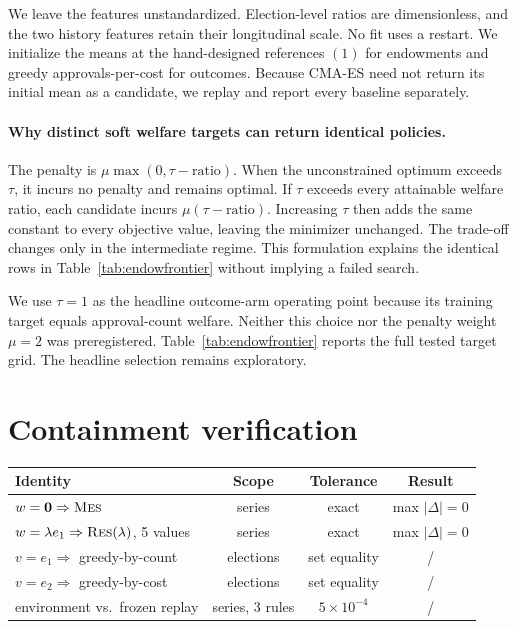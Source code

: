 We leave the features unstandardized. Election-level ratios are dimensionless,
and the two history features retain their longitudinal scale. No fit uses a
restart. We initialize the means at the hand-designed references \RES$(1)$
for endowments and greedy approvals-per-cost for outcomes. Because CMA-ES need
not return its initial mean as a candidate, we replay and report every
baseline separately.

\paragraph{Why distinct soft welfare targets can return identical policies.}
The penalty is $\mu \max(0, \tau - \text{ratio})$. When the unconstrained
optimum exceeds $\tau$, it incurs no penalty and remains optimal. If $\tau$
exceeds every attainable welfare ratio, each candidate incurs
$\mu(\tau - \text{ratio})$. Increasing $\tau$ then adds the same constant to
every objective value, leaving the minimizer unchanged. The trade-off changes
only in the intermediate regime. This formulation explains the identical rows
in Table~\ref{tab:endowfrontier} without implying a failed search.

We use $\tau=1$ as the headline outcome-arm operating point because its
training target equals \MES{} approval-count welfare. Neither this choice nor
the penalty weight $\mu=2$ was preregistered. Table~\ref{tab:endowfrontier}
reports the full tested target grid. The headline selection remains
exploratory.

\section{Containment verification}
\label{app:containment}

\begin{table}[ht]
\centering\small
\begin{tabular}{lccc}
\toprule
Identity & Scope & Tolerance & Result \\
\midrule
$w = \mathbf{0} \Rightarrow \textsc{Mes}$ & \NumSeriesTotal{} series & exact & max $|\Delta| = 0$ \\
$w = \lambda e_1 \Rightarrow \textsc{Res}(\lambda)$, 5 values & \NumSeriesTotal{} series & exact & max $|\Delta| = 0$ \\
$v = e_1 \Rightarrow$ greedy-by-count & \PrimaryElectionN{} elections & set equality & \PrimaryElectionN{}/\PrimaryElectionN{} \\
$v = e_2 \Rightarrow$ greedy-by-cost & \PrimaryElectionN{} elections & set equality & \PrimaryElectionN{}/\PrimaryElectionN{} \\
environment vs.\ frozen replay & \NumSeriesTotal{} series, 3 rules & $5\times10^{-4}$ & \NumSeriesTotal{}/\NumSeriesTotal{} \\
\bottomrule
\end{tabular}
\end{table}

